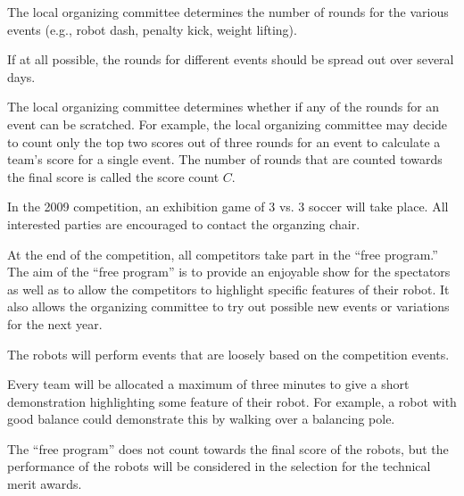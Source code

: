\documentclass[12pt]{hurocup}
\begin{document}
\begin{lawlist}[ORG]
  
\item The local organizing committee determines the number of rounds
 for the various events (e.g., robot dash, penalty kick, weight lifting).
  
\item If at all possible, the rounds for different events should be spread out  over several days.
 
\item The local organizing committee determines whether if any of the rounds 
 for an event can be scratched. For example, the local organizing
 committee may decide to count only the top two scores out of three
 rounds for an event to calculate a team's score for a single
 event. The number of rounds that are counted towards the final score
 is called the score count $C$.

\end{lawlist}

\begin{decisions}
\item In the 2009 competition, an exhibition game of 3 vs. 3 soccer
will take place. All interested parties are encouraged to contact the
organzing chair.
\end{decisions}


\begin{lawlist}[ORG]
  
\item At the end of the competition, all competitors take part in the
 ``free program.'' The aim of the ``free program'' is to provide an
 enjoyable show for the spectators as well as to allow the competitors
 to highlight specific features of their robot. It also allows the
 organizing committee to try out possible new events or variations for
 the next year.
  
\item The robots will perform events that are loosely based on the
 competition events. 
  
\item Every team will be allocated a maximum of three minutes to give
 a short demonstration highlighting some feature of their robot. For
 example, a robot with good balance could demonstrate this by walking
 over a balancing pole.
  
\item The ``free program'' does not count towards the final score of
 the robots, but the performance of the robots will be considered in
 the selection for the technical merit awards.

\end{lawlist}
\end{document}
